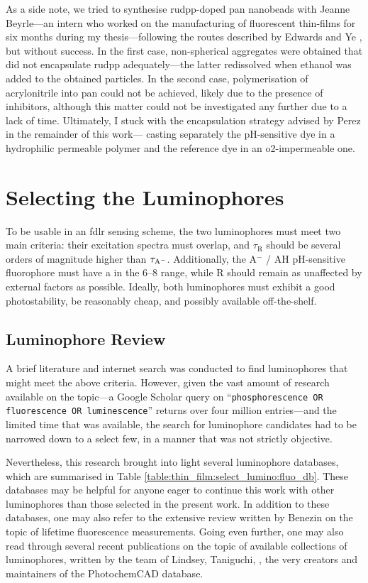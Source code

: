 As a side note, we tried to synthesise \gls{rudpp}-doped \gls{pan} nanobeads with Jeanne Beyrle---an intern who worked on the manufacturing of fluorescent thin-films for six months during my thesis---following the routes described by Edwards\cite[Chap.~2]{edwards2011_phd} and Ye \etal{}\cite{ye2012}, but without success. In the first case, non-spherical aggregates were obtained that did not encapsulate \gls{rudpp} adequately---the latter redissolved when ethanol was added to the obtained particles. In the second case, polymerisation of acrylonitrile into \gls{pan} could not be achieved, likely due to the presence of inhibitors, although this matter could not be investigated any further due to a lack of time. Ultimately, I stuck with the encapsulation strategy advised by Perez \etal{} in the remainder of this work---\ie{} casting separately the pH-sensitive dye in a hydrophilic permeable polymer and the reference dye in an \gls{o2}-impermeable one.

\section{Selecting the Luminophores}\label{sect:thin_film:select_lumino}

To be usable in an \gls{fdlr} sensing scheme, the two luminophores must meet two main criteria: their excitation spectra must overlap, and $\tau_\mathrm{R}$ should be several orders of magnitude higher than $\tau_\mathrm{A^{\smash{-}}}$. Additionally, the A$^-$ / AH pH-sensitive fluorophore must have a \pKa{} in the 6--8 range, while R should remain as unaffected by external factors as possible. Ideally, both luminophores must exhibit a good photostability, be reasonably cheap, and possibly available off-the-shelf.

\subsection{Luminophore Review}

A brief literature and internet search was conducted to find luminophores that might meet the above criteria. However, given the vast amount of research available on the topic---a Google Scholar query on \enquote{\texttt{phosphorescence OR fluorescence OR luminescence}} returns over four million entries---and the limited time that was available, the search for luminophore candidates had to be narrowed down to a select few, in a manner that was not strictly objective.

Nevertheless, this research brought into light several luminophore databases, which are summarised in Table \ref{table:thin_film:select_lumino:fluo_db}. These databases may be helpful for anyone eager to continue this work with other luminophores than those selected in the present work. In addition to these databases, one may also refer to the extensive review written by Benezin \etal{}\cite{berezin2010} on the topic of lifetime fluorescence measurements. Going even further, one may also read through several recent publications on the topic of available collections of luminophores, written by the team of Lindsey, Taniguchi, \etal{}\cite{taniguchi2018a, taniguchi2018b}, the very creators and maintainers of the PhotochemCAD database.


